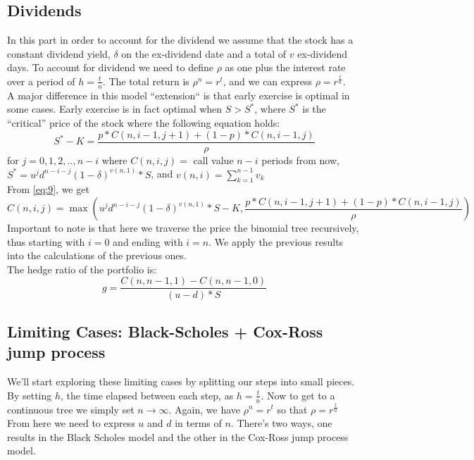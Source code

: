 \documentclass{article}
\begin{document}
\subsection{Dividends}
In this part in order to account for the dividend we assume that the stock has a constant dividend yield, $\delta$ on the ex-dividend date and a total of $v$ ex-dividend days. To account for dividend we need to define $\rho$ as one plus the interest rate over a period of $h=\frac{t}{n}$. The total return  is $\rho^{n} = r^{t}$, and we can express $\rho= r^{\frac{t}{n}}$. \\
A major difference in this model “extension“ is that early exercise is optimal in some cases. Early exercise is in fact optimal when $S > S^{*}$, where $S^{*}$ is the “critical” price of the stock where the following equation holds:
\begin{equation}\label{eq:9}
    S^{*} - K = \frac{p*C(n,i-1,j+1) + (1-p)*C(n,i-1,j)}{\rho}
\end{equation}
for $j = 0, 1, 2, .., n-i$ where $C(n, i, j) =$ call value $n-i$ periods from now, $S^{*} = u^{j}d^{n-i-j}(1-\delta)^{v(n,1)}*S$, and $v(n,i)=\sum_{k=1}^{n-1}v_{k}$ \\ [4ex]
From \ref{eq:9}, we get 
\begin{equation}\label{eq:10}
   C(n,i,j) = \max\left(u^{j}d^{n-i-j}(1-\delta)^{v(n,1)}*S - K, \frac{p*C(n,i-1,j+1) + (1-p)*C(n,i-1,j)}{\rho}\right)
\end{equation}
Important to note is that here we traverse the price the binomial tree recursively, thus starting with $i = 0$ and ending with $i = n$. We apply the previous results into the calculations of the previous ones. \\ [2ex]
The hedge ratio of the portfolio is:
\begin{equation*}
    g = \frac{C(n, n - 1, 1) - C(n, n -1, 0)}{(u - d) * S}
\end{equation*}
\subsection{Limiting Cases: Black-Scholes + Cox-Ross jump process}
We’ll start exploring these limiting cases by splitting our steps into small pieces. By setting $h$, the time elapsed between each step, as $h = \frac{t}{n}$. Now to get to a continuous tree we simply set $n \rightarrow \infty$. Again, we have $\rho^{n} = r^{t}$ so that $\rho = r^{\frac{t}{n}}$\\ [2ex]
From here we need to express $u$ and $d$ in terms of $n$. There’s two ways, one results in the Black Scholes model and the other in the Cox-Ross jump process model.
\end{document}
